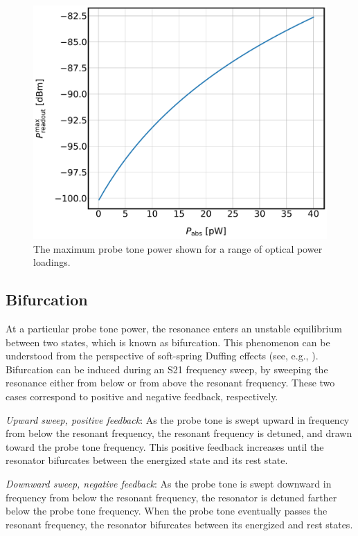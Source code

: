 \begin{figure}[!htbp]
\centering
\includegraphics[width=\textwidth]{figures/kid_model/Pmax}
\caption[The maximum probe tone power shown for a range of optical power loadings.]{The maximum probe tone power shown for a range of optical power loadings.}
\label{fig:Pmax}
\end{figure}

\subsection{Bifurcation}\label{bifurc}

At a particular probe tone power, the resonance enters an unstable equilibrium between two states, which is known as bifurcation. This phenomenon can be understood from the perspective of soft-spring Duffing effects (see, e.g., \citet{swenson2013operation,duffing1918erzwungene}). Bifurcation can be induced during an \gls{S21} frequency sweep, by sweeping the resonance either from below or from above the resonant frequency. These two cases correspond to positive and negative feedback, respectively.

\textit{Upward sweep, positive feedback}:
As the probe tone is swept upward in frequency from below the resonant frequency, the resonant frequency is detuned, and drawn toward the probe tone frequency. This positive feedback increases until the resonator bifurcates between the energized state and its rest state.

\textit{Downward sweep, negative feedback}:
As the probe tone is swept downward in frequency from below the resonant frequency, the resonator is detuned farther below the probe tone frequency. When the probe tone eventually passes the resonant frequency, the resonator bifurcates between its energized and rest states.

